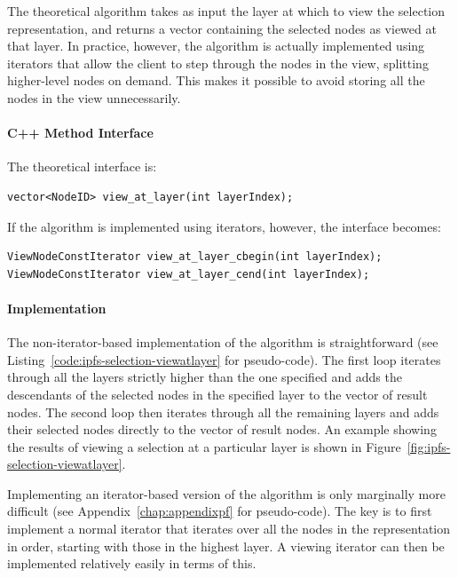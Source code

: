 The theoretical algorithm takes as input the layer at which to view the selection representation, and returns a vector containing the selected nodes as viewed at that layer. In practice, however, the algorithm is actually implemented using iterators that allow the client to step through the nodes in the view, splitting higher-level nodes on demand. This makes it possible to avoid storing all the nodes in the view unnecessarily.

\paragraph{C++ Method Interface}

The theoretical interface is:

\begin{lstlisting}[style=Prototype]
vector<NodeID> view_at_layer(int layerIndex);
\end{lstlisting}

\noindent If the algorithm is implemented using iterators, however, the interface becomes:

\begin{lstlisting}[style=Prototype]
ViewNodeConstIterator view_at_layer_cbegin(int layerIndex);
ViewNodeConstIterator view_at_layer_cend(int layerIndex);
\end{lstlisting}

\paragraph{Implementation}

The non-iterator-based implementation of the algorithm is straightforward (see Listing~\ref{code:ipfs-selection-viewatlayer} for pseudo-code). The first loop iterates through all the layers strictly higher than the one specified and adds the descendants of the selected nodes in the specified layer to the vector of result nodes. The second loop then iterates through all the remaining layers and adds their selected nodes directly to the vector of result nodes. An example showing the results of viewing a selection at a particular layer is shown in Figure~\ref{fig:ipfs-selection-viewatlayer}.

Implementing an iterator-based version of the algorithm is only marginally more difficult (see Appendix~\ref{chap:appendixpf} for pseudo-code). The key is to first implement a normal iterator that iterates over all the nodes in the representation in order, starting with those in the highest layer. A viewing iterator can then be implemented relatively easily in terms of this.

